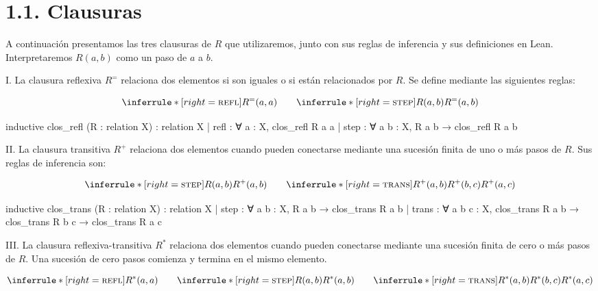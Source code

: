 \documentclass[
  spanish,
  letterpaper,
  DIV=11,
  numbers=noendperiod]{scrreprt}
\newenvironment{Shaded}{\begin{snugshade}}{\end{snugshade}}
\newcommand{\NormalTok}[1]{\textcolor[rgb]{0.00,0.23,0.31}{#1}}
\renewcommand{\NormalTok}[1]{\textcolor[HTML]{000000}{#1}}
\theoremstyle{remark}
\begin{document}
\section{1.1. Clausuras}\label{clausuras}

A continuación presentamos las tres clausuras de \(R\) que utilizaremos,
junto con sus reglas de inferencia y sus definiciones en Lean.
Interpretaremos \(R(a,b)\) como un paso de \(a\) a \(b\).

I. La clausura reflexiva \(R^{=}\) relaciona dos elementos si son
iguales o si están relacionados por \(R\). Se define mediante las
siguientes reglas:

\[
\inferrule*[right=\textsc{refl}]
  { }
  {R^=(a,a)}
\qquad
\inferrule*[right=\textsc{step}]
  {R(a,b)}
  {R^=(a,b)}
\]

\begin{Shaded}
\begin{Highlighting}[]
\NormalTok{inductive clos\_refl (R : relation X) : relation X}
\NormalTok{  | refl : ∀ a : X,}
\NormalTok{      clos\_refl R a a}
\NormalTok{  | step : ∀ a b : X,}
\NormalTok{      R a b → clos\_refl R a b}
\end{Highlighting}
\end{Shaded}

II. La clausura transitiva \(R^{+}\) relaciona dos elementos cuando
pueden conectarse mediante una sucesión finita de uno o más pasos de
\(R\). Sus reglas de inferencia son:

\[
\inferrule*[right=\textsc{step}]
  {R(a,b)}
  {R^+(a,b)}
\qquad
\inferrule*[right=\textsc{trans}]
  {R^+(a,b) \\
   R^+(b,c)}
  {R^+(a,c)}
\]

\begin{Shaded}
\begin{Highlighting}[]
\NormalTok{inductive clos\_trans (R : relation X) : relation X}
\NormalTok{  | step : ∀ a b : X,}
\NormalTok{      R a b → clos\_trans R a b}
\NormalTok{  | trans : ∀ a b c : X,}
\NormalTok{      clos\_trans R a b → clos\_trans R b c →}
\NormalTok{      clos\_trans R a c}
\end{Highlighting}
\end{Shaded}

III. La clausura reflexiva-transitiva \(R^*\) relaciona dos elementos
cuando pueden conectarse mediante una sucesión finita de cero o más
pasos de \(R\). Una sucesión de cero pasos comienza y termina en el
mismo elemento.

\[
\inferrule*[right=\textsc{refl}]
  { }
  {R^*(a,a)}
\qquad
\inferrule*[right=\textsc{step}]
  {R(a,b)}
  {R^*(a,b)}
\qquad
\inferrule*[right=\textsc{trans}]
  {R^*(a,b) \\
   R^*(b,c)}
  {R^*(a,c)}
\]
\end{document}
